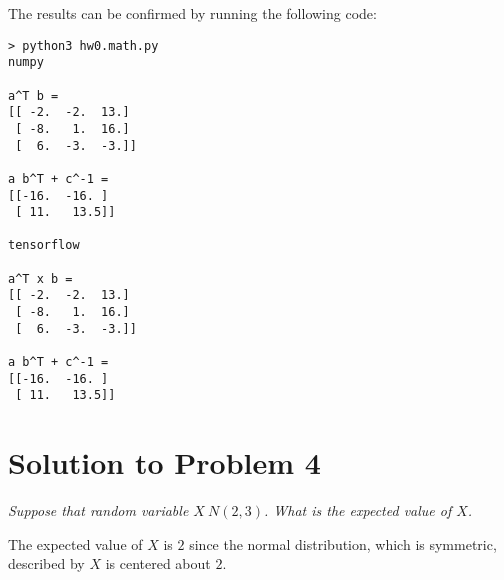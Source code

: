 \documentclass[a4paper]{article}
\begin{document}
\begin{enumerate}[label=(\alph*)]
    The results can be confirmed by running the following code:

\begin{lstlisting}[]
> python3 hw0.math.py
numpy

a^T b =
[[ -2.  -2.  13.]
 [ -8.   1.  16.]
 [  6.  -3.  -3.]]

a b^T + c^-1 =
[[-16.  -16. ]
 [ 11.   13.5]]

tensorflow

a^T x b =
[[ -2.  -2.  13.]
 [ -8.   1.  16.]
 [  6.  -3.  -3.]]

a b^T + c^-1 =
[[-16.  -16. ]
 [ 11.   13.5]]
\end{lstlisting}
\end{enumerate}


\section{Solution to Problem 4}
\textit{
    Suppose that random variable $X ~ N(2,3)$. What is the expected value of $X$.
} \vspace{5mm}

The expected value of $X$ is $2$ since the normal distribution, which is symmetric, described by $X$ is centered about $2$.
\end{document}
